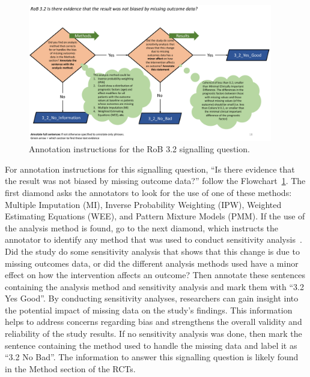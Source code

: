\documentclass[sn-mathphys,Numbered]{sn-jnl}%
\begin{document}
%
%
%
\begin{figure}[hbt]
    \centering
    \includegraphics[width=0.95\textwidth]{figures/3_2.pdf}
    \caption{Annotation instructions for the RoB 3.2 signalling question.}
    \label{fig:3_2}
\end{figure}
%
%
%


For annotation instructions for this signalling question, ``Is there evidence that the result was not biased by missing outcome data?'' follow the Flowchart~\ref{fig:3_2}.
The first diamond asks the annotators to look for the use of one of these methods: Multiple Imputation (MI), Inverse Probability Weighting (IPW), Weighted Estimating Equations (WEE), and Pattern Mixture Models (PMM).
If the use of the analysis method is found, go to the next diamond, which instructs the annotator to identify any method that was used to conduct sensitivity analysis~\cite{goldberg2021data}.
Did the study do some sensitivity analysis that shows that this change is due to missing outcomes data, or did the different analysis methods used have a minor effect on how the intervention affects an outcome?
Then annotate these sentences containing the analysis method and sensitivity analysis and mark them with ``3.2 Yes Good''.
By conducting sensitivity analyses, researchers can gain insight into the potential impact of missing data on the study's findings. This information helps to address concerns regarding bias and strengthens the overall validity and reliability of the study results.
If no sensitivity analysis was done, then mark the sentence containing the method used to handle the missing data and label it as ``3.2 No Bad''.
The information to answer this signalling question is likely found in the Method section of the RCTs.

%
%
%
\end{document}

